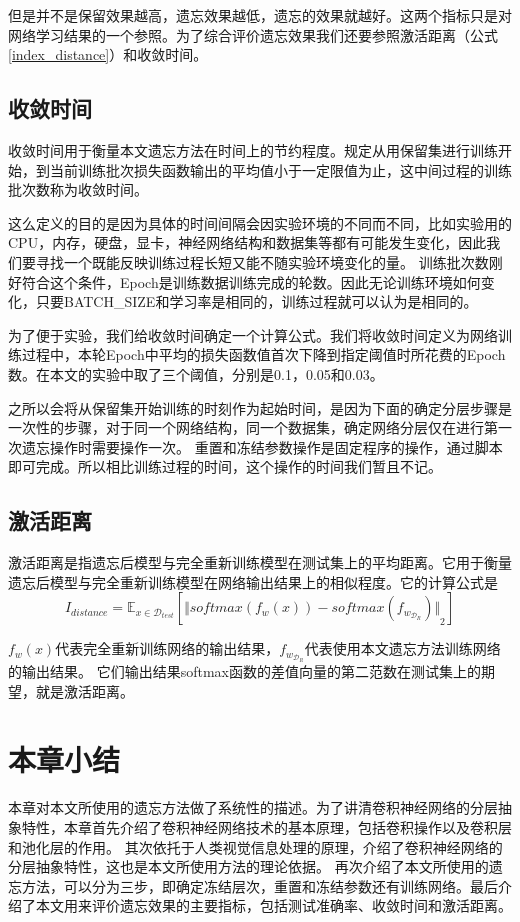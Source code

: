 但是并不是保留效果越高，遗忘效果越低，遗忘的效果就越好。这两个指标只是对网络学习结果的一个参照。为了综合评价遗忘效果我们还要参照激活距离（公式\ref{index_distance}）和收敛时间。

\subsection{收敛时间}

收敛时间用于衡量本文遗忘方法在时间上的节约程度。规定从用保留集进行训练开始，到当前训练批次损失函数输出的平均值小于一定限值为止，这中间过程的训练批次数称为收敛时间。

这么定义的目的是因为具体的时间间隔会因实验环境的不同而不同，比如实验用的CPU，内存，硬盘，显卡，神经网络结构和数据集等都有可能发生变化，因此我们要寻找一个既能反映训练过程长短又能不随实验环境变化的量。
训练批次数刚好符合这个条件，Epoch是训练数据训练完成的轮数。因此无论训练环境如何变化，只要BATCH\_SIZE和学习率是相同的，训练过程就可以认为是相同的。

为了便于实验，我们给收敛时间确定一个计算公式。我们将收敛时间定义为网络训练过程中，本轮Epoch中平均的损失函数值首次下降到指定阈值时所花费的Epoch数。在本文的实验中取了三个阈值，分别是0.1，0.05和0.03。

之所以会将从保留集开始训练的时刻作为起始时间，是因为下面的确定分层步骤是一次性的步骤，对于同一个网络结构，同一个数据集，确定网络分层仅在进行第一次遗忘操作时需要操作一次。
重置和冻结参数操作是固定程序的操作，通过脚本即可完成。所以相比训练过程的时间，这个操作的时间我们暂且不记。

\subsection{激活距离}

激活距离是指遗忘后模型与完全重新训练模型在测试集上的平均距离。它用于衡量遗忘后模型与完全重新训练模型在网络输出结果上的相似程度。它的计算公式是
\begin{equation}
I_{distance} = {\mathbb{E}}_{x\in {\mathcal{D}_{test}}}[{\Vert softmax(f_w(x)) - softmax(f_{w_{\mathcal{D}_R}}) \Vert}_2 ] \label{index_distance}
\end{equation}

$f_w(x)$代表完全重新训练网络的输出结果，$f_{w_{\mathcal{D}_R}}$代表使用本文遗忘方法训练网络的输出结果。
它们输出结果softmax函数的差值向量的第二范数在测试集上的期望，就是激活距离。


\section{本章小结}
本章对本文所使用的遗忘方法做了系统性的描述。为了讲清卷积神经网络的分层抽象特性，本章首先介绍了卷积神经网络技术的基本原理，包括卷积操作以及卷积层和池化层的作用。
其次依托于人类视觉信息处理的原理，介绍了卷积神经网络的分层抽象特性，这也是本文所使用方法的理论依据。
再次介绍了本文所使用的遗忘方法，可以分为三步，即确定冻结层次，重置和冻结参数还有训练网络。最后介绍了本文用来评价遗忘效果的主要指标，包括测试准确率、收敛时间和激活距离。
